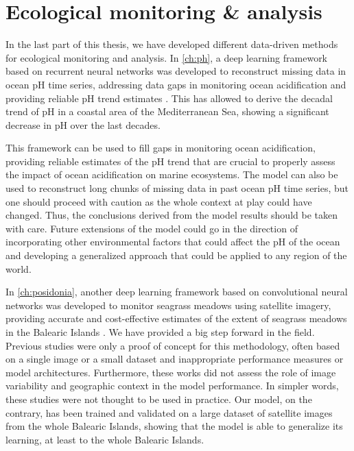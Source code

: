 \section{Ecological monitoring \& analysis}

In the last part of this thesis, we have developed different data-driven
methods for ecological monitoring and analysis. In \cref{ch:ph}, a deep
learning framework based on recurrent neural networks was developed to
reconstruct missing data in ocean pH time series, addressing data gaps in
monitoring ocean acidification and providing reliable pH trend estimates
\cite{Flecha2022}. This has allowed to derive the decadal trend of pH in a
coastal area of the Mediterranean Sea, showing a significant decrease in pH
over the last decades.

This framework can be used to fill gaps in monitoring ocean acidification,
providing reliable estimates of the pH trend that are crucial to properly
assess the impact of ocean acidification on marine ecosystems. The model can
also be used to reconstruct long chunks of missing data in past ocean pH time
series, but one should proceed with caution as the whole context at play could
have changed. Thus, the conclusions derived from the model results should be
taken with care. Future extensions of the model could go in the direction of
incorporating other environmental factors that could affect the pH of the ocean
and developing a generalized approach that could be applied to any region of
the world.

In \cref{ch:posidonia}, another deep learning framework based on convolutional
neural networks was developed to monitor seagrass meadows using satellite
imagery, providing accurate and cost-effective estimates of the extent of
seagrass meadows in the Balearic Islands \cite{GimenezRomero2024_posi}. We have
provided a big step forward in the field. Previous studies were only a proof of
concept for this methodology, often based on a single image or a small dataset
and inappropriate performance measures or model architectures. Furthermore,
these works did not assess the role of image variability and geographic context
in the model performance. In simpler words, these studies were not thought to
be used in practice. Our model, on the contrary, has been trained and validated
on a large dataset of satellite images from the whole Balearic Islands, showing
that the model is able to generalize its learning, at least to the whole
Balearic Islands.

